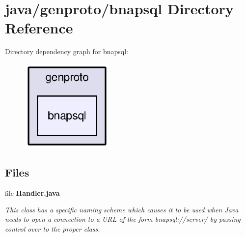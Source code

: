 \section{java/genproto/bnapsql Directory Reference}
\label{dir_cb015bdd6bbc27dab8cbcb9f530241fa}
Directory dependency graph for bnapsql\+:\nopagebreak
\begin{figure}[H]
\begin{center}
\leavevmode
\includegraphics[width=130pt]{dir_cb015bdd6bbc27dab8cbcb9f530241fa_dep}
\end{center}
\end{figure}
\subsection*{Files}
\begin{DoxyCompactItemize}
\item 
file {\bf Handler.\+java}
\begin{DoxyCompactList}\small\item\em This class has a specific naming scheme which causes it to be used when Java needs to open a connection to a U\+R\+L of the form bnapsql\+://server/ by passing control over to the proper class. \end{DoxyCompactList}\end{DoxyCompactItemize}
